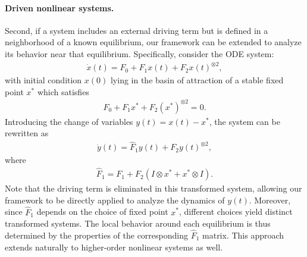 \documentclass[superscriptaddress,onecolumn,nofootinbib,longbibliography,a4paper,accepted=2026-09-29]{quantumarticle}
\theoremstyle{plain}
\theoremstyle{definition}
\numberwithin{thm}{section}
\numberwithin{assumption}{section}
\numberwithin{lemma}{section}
\numberwithin{prop}{section}
\numberwithin{cor}{section}
\numberwithin{definition}{section}
\numberwithin{rmk}{section}
\numberwithin{equation}{section}
\begin{document}
\paragraph{Driven nonlinear systems.} Second, if a system includes an external driving term but is defined in a neighborhood of a known equilibrium, our framework can be extended to analyze its behavior near that equilibrium. Specifically, consider the ODE system:
\begin{align}
\dot{x}(t)  = F_0 + F_1 x(t) + F_2 x(t)^{\otimes 2},
\end{align}
with initial condition $x(0)$ lying in the basin of attraction of a stable fixed point  $x^*$ which satisfies
\begin{align}
F_0 + F_1 x^* + F_2 (x^*)^{\otimes 2} = 0.
\end{align}
Introducing the change of variables $y(t) = x(t) - x^*$, the system can be rewritten as
\begin{align}
\dot{y}(t) = \hat{F}_1 y(t) + F_2 y(t)^{\otimes 2},
\end{align}
where
\begin{align}
\hat{F}_1 = F_1 + F_2 (I \otimes x^* + x^* \otimes I).
\end{align}
Note that the driving term is eliminated in this transformed system, allowing our framework to be directly applied to analyze the dynamics of $y(t)$. Moreover, since $\hat{F}_1$ depends on the choice of fixed point $x^*$, different choices yield distinct transformed systems. The local behavior around each equilibrium is thus determined by the properties of the corresponding $\hat{F}_1$ matrix. This approach extends naturally to higher-order nonlinear systems as well.
\end{document}
